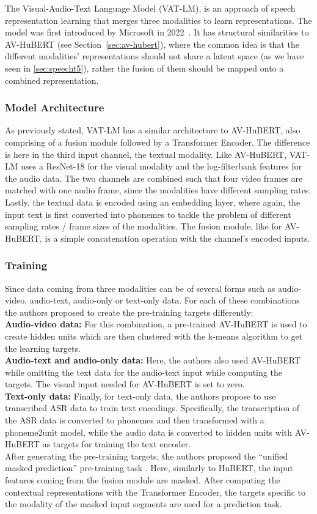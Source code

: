 The Visual-Audio-Text Language Model (VAT-LM), is an approach of speech representation learning that merges three modalities to learn representations. The model was first introduced by Microsoft in 2022~\cite{vatlm}. It has structural similarities to AV-HuBERT (see Section~\ref{sec:av-hubert}), where the common idea is that the different modalities' representations should not share a latent space (as we have seen in \ref{sec:speecht5}), rather the fusion of them should be mapped onto a combined representation.
\subsubsection{Model Architecture}
As previously stated, VAT-LM has a similar architecture to AV-HuBERT, also comprising of a fusion module followed by a Transformer Encoder. The difference is here in the third input channel, the textual modality. Like AV-HuBERT, VAT-LM uses a ResNet-18 for the visual modality and the log-filterbank features for the audio data. The two channels are combined such that four video frames are matched with one audio frame, since the modalities have different sampling rates. Lastly, the textual data is encoded using an embedding layer, where again, the input text is first converted into phonemes to tackle the problem of different sampling rates / frame sizes of the modalities. The fusion module, like for AV-HuBERT, is a simple concatenation operation with the channel's encoded inputs.
\subsubsection{Training}
Since data coming from three modalities can be of several forms such as audio-video, audio-text, audio-only or text-only data. For each of these combinations the authors proposed to create the pre-training targets differently:\\
\textbf{Audio-video data:} For this combination, a pre-trained AV-HuBERT is used to create hidden units which are then clustered with the k-means algorithm to get the learning targets.\\
\textbf{Audio-text and audio-only data:} Here, the authors also used AV-HuBERT while omitting the text data for the audio-text input while computing the targets. The visual input needed for AV-HuBERT is set to zero.\\
\textbf{Text-only data:} Finally, for text-only data, the authors propose to use transcribed ASR data to train text encodings. Specifically, the transcription of the ASR data is converted to phonemes and then transformed with a phoneme2unit model, while the audio data is converted to hidden units with AV-HuBERT as targets for training the text encoder.\\
After generating the pre-training targets, the authors proposed the ``unified masked prediction'' pre-training task \cite{vatlm}. Here, similarly to HuBERT, the input features coming from the fusion module are masked. After computing the contextual representations with the Transformer Encoder, the targets specific to the modality of the masked input segments are used for a prediction task.
